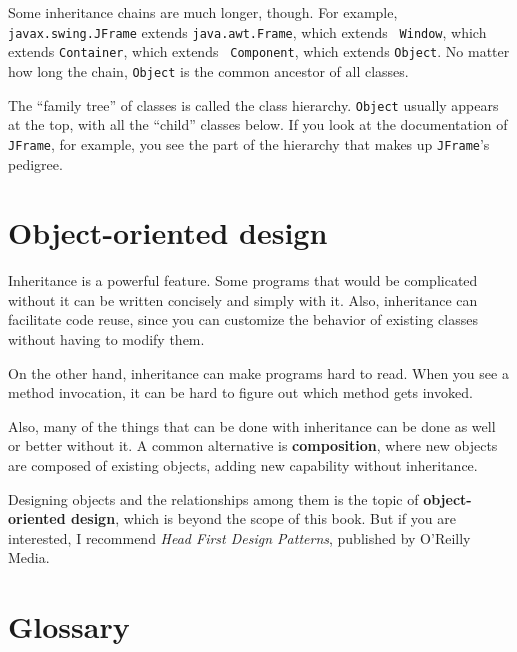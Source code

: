 \documentclass[12pt]{book}
\theoremstyle{exercise}
\begin{document}
Some inheritance chains are much longer, though.  For example, {\tt
  javax.swing.JFrame} extends {\tt java.awt.Frame}, which extends {\tt
  Window}, which extends {\tt Container}, which extends {\tt
  Component}, which extends {\tt Object}.  No matter how long the
chain, {\tt Object} is the common ancestor of all classes.

The ``family tree'' of classes is called the class hierarchy.  {\tt Object}
usually appears at the top, with all the ``child'' classes below.  If
you look at the documentation of {\tt JFrame}, for example, you
see the part of the hierarchy that makes up {\tt JFrame}'s pedigree.


\section {Object-oriented design}

Inheritance is a powerful feature.  Some programs that would be
complicated without it can be written concisely and simply
with it.  Also, inheritance can facilitate code reuse, since you can
customize the behavior of existing classes without having to modify
them.

On the other hand, inheritance can make programs hard to read.  When
you see a method invocation, it can be hard to figure out which method
gets invoked.

Also, many of the things that can be done with inheritance can
be done as well or better without it.
A common alternative is {\bf composition}, where new objects are
composed of existing objects, adding new capability without
inheritance.

Designing objects and the relationships among them is the topic
of {\bf object-oriented design}, which is beyond the scope of this
book.  But if you are interested, I recommend {\em Head First Design
Patterns}, published by O'Reilly Media.


\section{Glossary}
\end{document}
